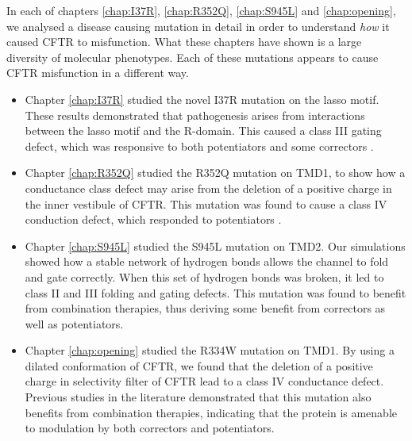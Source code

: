 In each of chapters \ref{chap:I37R}, \ref{chap:R352Q}, \ref{chap:S945L} and \ref{chap:opening}, we analysed a disease causing mutation in detail in order to understand \textit{how} it caused CFTR to misfunction. What these chapters have shown is a large diversity of molecular phenotypes. Each of these mutations appears to cause CFTR misfunction in a different way. 


\begin{itemize}
	\item Chapter \ref{chap:I37R} studied the novel I37R mutation on the lasso motif. These results demonstrated that pathogenesis arises from interactions between the lasso motif and the R-domain. This caused a class III gating defect, which was responsive to both potentiators and some correctors \cite{wong2022}. 
	\item Chapter \ref{chap:R352Q} studied the R352Q mutation on TMD1, to show how a conductance class defect may arise from the deletion of a positive charge in the inner vestibule of CFTR. This mutation was found to cause a class IV conduction defect, which responded to potentiators \cite{wong2022a}.
\item Chapter \ref{chap:S945L} studied the S945L mutation on TMD2. Our simulations showed how a stable network of hydrogen bonds allows the channel to fold and gate correctly. When this set of hydrogen bonds was broken, it led to class II and III folding and gating defects. This mutation was found to benefit from combination therapies, thus deriving some benefit from correctors as well as potentiators.  
\item Chapter \ref{chap:opening} studied the R334W mutation on TMD1. By using a dilated conformation of CFTR, we found that the deletion of a positive charge in selectivity filter of CFTR lead to a class IV conductance defect. Previous studies in the literature demonstrated that this mutation also benefits from combination therapies, indicating that the protein is amenable to modulation by both correctors and potentiators. 
\end{itemize}

